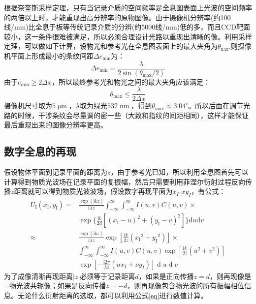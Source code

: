 \documentclass{WHUReport}
\begin{document}
\begin{multicols}{2}
	根据奈奎斯采样定理，只有当记录介质的空间频率是全息图表面上光波的空间频率的两倍以上时，才能重现出高分辨率的原物图像。由于摄像机分辨率(约100线/mm)比全息于板等传统记录介质的分辨(约5000线/mm)低的多，而且CCD靶面较小，这一条件很难被满足，所以必须合理设计光路以重现出清晰的像。利用采样定理，可以做如下计算，设物光和参考光在全息图表面上的最大夹角为$\theta_\mathrm{nax}$,则摄像机平面上形成最小的条纹间距$\Delta e_\mathrm{min}$为：
	\begin{equation}
		\Delta e_{\min}=\frac{\lambda}{2\sin(\theta_{\max}/2)}
	\end{equation}
	由于$e_{\min}\geq 2\Delta x$，所以最终参考光和物光之间的最大夹角应该满足：
	\begin{equation}
		\theta_{\max}\leq\frac\lambda{2\Delta x}
	\end{equation}
	摄像机尺寸取为$5\operatorname*{\mu m}$，$\lambda$取为绿光$532\operatorname*{nm}$，得到$\theta_{\max}\approx 3.04^\circ$。所以后面在调节光路的时候，干涉条纹会尽量调的密一些（大致和指纹的间距相同），这样才能保证最后重现出来的图像分辨率更高。
	\subsection{数字全息的再现}
	假设物体平面到记录平面的距离为$z$，由于参考光已知，所以利用全息图首先可以计算得到物质光波场在记录平面的复振幅，然后只需要利用菲涅尔衍射过程反向传播$z$距离就可以得到物质光波波场，假设数字再现平面为$x_I\mbox{-}xy_I$，有公式：
	\begin{equation}\label{eq}
		\begin{aligned}
			U_{\mathrm{I}}(x_{\mathrm{I}},y_{\mathrm{I}})=&\frac{\exp(\mathrm{i}kz)}{\mathrm{i}\lambda z }\int_{-\infty}^{\infty}\int_{-\infty}^{\infty}I(u,v)C(u,v)\times\\&\exp\{\frac{\mathrm{i}k}{2d}[(x_{\mathrm{I}}-u)^{2}+(y_{\mathrm{I}}-v)^{2}]\}\mathrm{d}u\mathrm{d}v\\
			\approx& \frac{\exp(\mathrm{i}kz)}{\mathrm{i}\lambda z}\exp[\frac{\mathrm{i}k}{2z}({x_{\mathrm{I}}}^{2}+{y_{\mathrm{I}}}^{2})]\times   \\
			&\int_{-\infty}^{\infty}\int_{-\infty}^{\infty}I(u,v)C(u,v)\exp[\frac{\mathrm{i}k}{2z}(u^{2}+v^{2})]\\&\exp[-\frac{\mathrm{i}2\pi}{\lambda z}(ux_{I}+\nu y_{I})]\operatorname{d}u\operatorname{d}v
		\end{aligned}
	\end{equation}
	为了成像清晰再现距离$|z|$必须等于记录距离$d$，如果是正向传播$z=d$，则再现像是=物光波共轭像；如果是反向传播$z=-d$，则再现像包含物光波的所有振幅相位信息。无论什么衍射距离的选取，都可以利用公式\ref{eq}进行数值计算。
	

\end{multicols}
\end{document}
